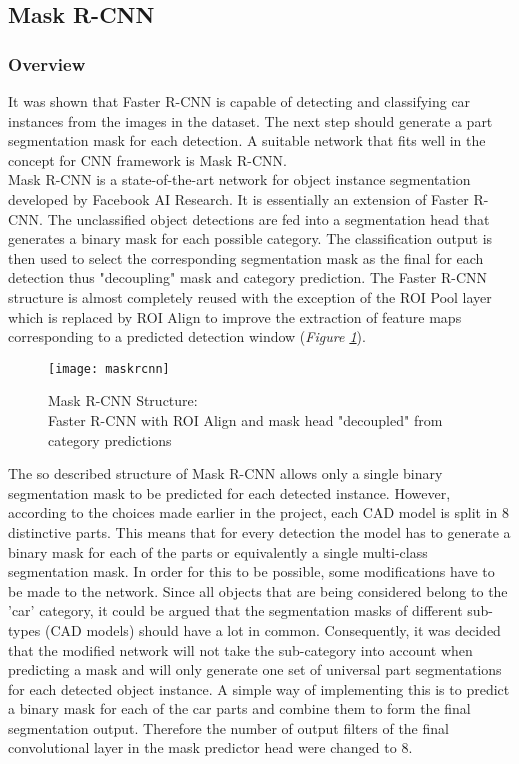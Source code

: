 \documentclass[main.tex]{subfiles}
\begin{document}
\subsection{Mask R-CNN}
\subsubsection{Overview}
It was shown that Faster R-CNN is capable of detecting and classifying car instances from the images in the dataset. The next step should generate a part segmentation mask for each detection. A suitable network that fits well in the concept for CNN framework is Mask R-CNN.\\
\indent Mask R-CNN \cite{He2017} is a state-of-the-art network for object instance segmentation developed by Facebook AI Research. It is essentially an extension of Faster R-CNN. The unclassified object detections are fed into a segmentation head that generates a binary mask for each possible category. The classification output is then used to select the corresponding segmentation mask as the final for each detection thus "decoupling" mask and category prediction. The Faster R-CNN structure is almost completely reused with the exception of the ROI Pool layer which is replaced by ROI Align \cite{He2017} to improve the extraction of feature maps corresponding to a predicted detection window (\emph{Figure \ref{fig:maskrcnn}}).
\begin{figure}[H]
\centering
\texttt{[image: maskrcnn]}
\captionsetup{justification=centering}
\caption{Mask R-CNN Structure: \\ Faster R-CNN with ROI Align and mask head "decoupled" from category predictions \cite{He2017}}
\label{fig:maskrcnn}
\end{figure}
The so described structure of Mask R-CNN allows only a single binary segmentation mask to be predicted for each detected instance. However, according to the choices made earlier in the project, each CAD model is split in 8 distinctive parts. This means that for every detection the model has to generate a binary mask for each of the parts or equivalently a single multi-class segmentation mask. In order for this to be possible, some modifications have to be made to the network. Since all objects that are being considered belong to the 'car' category, it could be argued that the segmentation masks of different sub-types (CAD models) should have a lot in common. Consequently, it was decided that the modified network will not take the sub-category into account when predicting a mask and will only generate one set of universal part segmentations for each detected object instance. A simple way of implementing this is to predict a binary mask for each of the car parts and combine them to form the final segmentation output. Therefore the number of output filters of the final convolutional layer in the mask predictor head were changed to 8.
\end{document}
